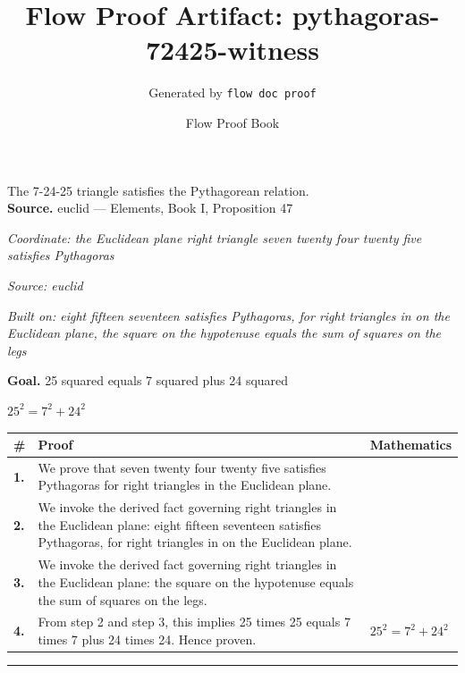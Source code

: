 \documentclass[11pt]{article}
\title{Flow Proof Artifact: pythagoras-72425-witness}
\author{Generated by \texttt{flow doc proof}}
\date{Flow Proof Book}
\theoremstyle{definition}
\begin{document}
\maketitle
The 7-24-25 triangle satisfies the Pythagorean relation.\\[0.5em]
\textbf{Source.} euclid — Elements, Book I, Proposition 47\\[0.5em]
\bigskip
{}\par
\smallskip\noindent\textit{Coordinate: the Euclidean plane \cdot right triangle \cdot seven twenty four twenty five satisfies Pythagoras}\par
\smallskip\noindent\textit{Source: euclid}\par
\smallskip\noindent\textit{Built on: eight fifteen seventeen satisfies Pythagoras, for right triangles in on the Euclidean plane, the square on the hypotenuse equals the sum of squares on the legs}\par
\medskip
\noindent\textbf{Goal.} 25 squared equals 7 squared plus 24 squared\par
\noindent$\displaystyle 25^{2} = 7^{2} + 24^{2}$\par
\medskip
\noindent
\begin{tabular}{@{} >{\raggedright\arraybackslash}p{} >{\raggedright\arraybackslash}p{} >{\raggedleft\arraybackslash}p{} @{}}
\textbf{\#} & \textbf{Proof} & \textbf{Mathematics} \\
\midrule
\textbf{1.} & We prove that seven twenty four twenty five satisfies Pythagoras for right triangles in the Euclidean plane. & \\[0.45em]
\textbf{2.} & We invoke the derived fact governing right triangles in the Euclidean plane: eight fifteen seventeen satisfies Pythagoras, for right triangles in on the Euclidean plane. & \\[0.45em]
\textbf{3.} & We invoke the derived fact governing right triangles in the Euclidean plane: the square on the hypotenuse equals the sum of squares on the legs. & \\[0.45em]
\textbf{4.} & From step 2 and step 3, this implies 25 times 25 equals 7 times 7 plus 24 times 24. Hence proven. & $\displaystyle 25^{2} = 7^{2} + 24^{2}$ \\[0.45em]
\bottomrule
\end{tabular}
\label{thm:Geometry-right triangle-seven_twenty_four_twenty_five_satisfies_pythagoras}
\par\medskip\hrule
\end{document}
